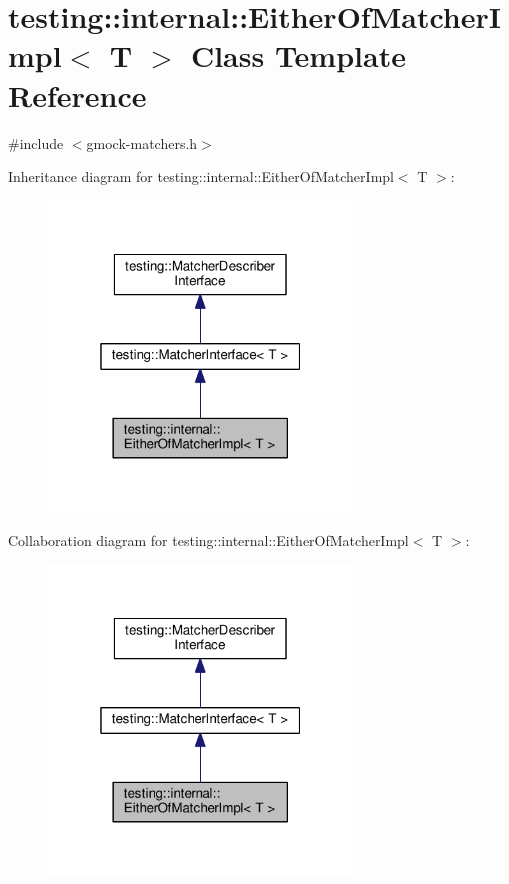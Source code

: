 \hypertarget{classtesting_1_1internal_1_1EitherOfMatcherImpl}{}\section{testing\+:\+:internal\+:\+:Either\+Of\+Matcher\+Impl$<$ T $>$ Class Template Reference}
\label{classtesting_1_1internal_1_1EitherOfMatcherImpl}


{\ttfamily \#include $<$gmock-\/matchers.\+h$>$}



Inheritance diagram for testing\+:\+:internal\+:\+:Either\+Of\+Matcher\+Impl$<$ T $>$\+:\nopagebreak
\begin{figure}[H]
\begin{center}
\leavevmode
\includegraphics[width=229pt]{classtesting_1_1internal_1_1EitherOfMatcherImpl__inherit__graph}
\end{center}
\end{figure}


Collaboration diagram for testing\+:\+:internal\+:\+:Either\+Of\+Matcher\+Impl$<$ T $>$\+:\nopagebreak
\begin{figure}[H]
\begin{center}
\leavevmode
\includegraphics[width=229pt]{classtesting_1_1internal_1_1EitherOfMatcherImpl__coll__graph}
\end{center}
\end{figure}
